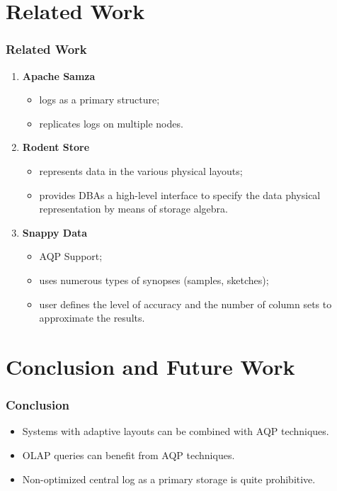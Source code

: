 \documentclass{beamer}
\begin{document}
\section{Related Work}
\begin{frame}
\frametitle{Related Work} \pause
\begin{enumerate}
\item{\textbf{Apache Samza}}
\begin{itemize}
\item{logs as a primary structure;}
\item{replicates logs on multiple nodes.}
\end{itemize}
\pause
\item{\textbf{Rodent Store}}
\begin{itemize}
\item{represents data in the various physical layouts;}
\item{provides DBAs a high-level interface to specify the data physical representation by means of storage algebra.}
\end{itemize}
\pause
\item{\textbf{Snappy Data}}
\begin{itemize}
\item{AQP Support;}
\item{uses numerous types of synopses (samples, sketches);}
\item{user defines the level of accuracy and the number of column sets to approximate the results.}
\end{itemize}
\end{enumerate}
\end{frame}

\section{Conclusion and Future Work}
\begin{frame}
\frametitle{Conclusion} \pause
\begin{itemize}
\item{Systems with adaptive layouts can be combined with AQP techniques.} \pause
\item{OLAP queries can benefit from AQP techniques.} \pause
\item{Non-optimized central log as a primary storage is quite prohibitive.}
\end{itemize}
\end{frame}
\end{document}
